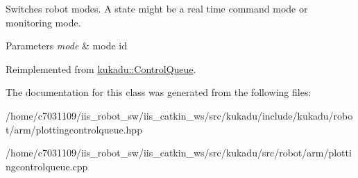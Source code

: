 Switches robot modes. A state might be a real time command mode or monitoring mode. 


\begin{DoxyParams}{Parameters}
{\em mode} & mode id \\
\hline
\end{DoxyParams}


Reimplemented from \hyperlink{classkukadu_1_1ControlQueue_a5defe63d9f1b9829676f9a31a4683911}{kukadu\-::\-Control\-Queue}.



The documentation for this class was generated from the following files\-:\begin{DoxyCompactItemize}
\item 
/home/c7031109/iis\-\_\-robot\-\_\-sw/iis\-\_\-catkin\-\_\-ws/src/kukadu/include/kukadu/robot/arm/plottingcontrolqueue.\-hpp\item 
/home/c7031109/iis\-\_\-robot\-\_\-sw/iis\-\_\-catkin\-\_\-ws/src/kukadu/src/robot/arm/plottingcontrolqueue.\-cpp\end{DoxyCompactItemize}
